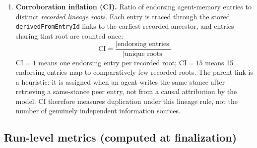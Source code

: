 \begin{enumerate}[leftmargin=*]
\item \textbf{Corroboration inflation (CI).} Ratio of endorsing agent-memory entries to distinct \emph{recorded lineage roots}. Each entry is traced through the stored \texttt{derivedFromEntryId} links to the earliest recorded ancestor, and entries sharing that root are counted once:
\[
\text{CI} = \frac{|\text{endorsing entries}|}{|\text{unique roots}|}
\]
$\text{CI} = 1$ means one endorsing entry per recorded root; $\text{CI} = 15$ means 15 endorsing entries map to comparatively few recorded roots. The parent link is a heuristic: it is assigned when an agent writes the same stance after retrieving a same-stance peer entry, not from a causal attribution by the model. CI therefore measures duplication under this lineage rule, not the number of genuinely independent information sources.
\end{enumerate}

\subsection{Run-level metrics (computed at finalization)}

